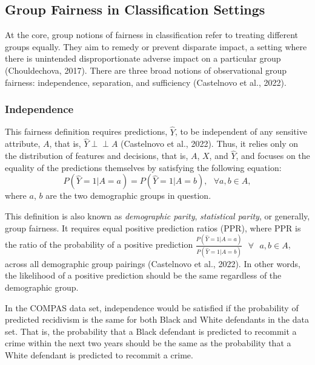 \documentclass[12pt, twoside]{amherstthesis}
\begin{document}
\hypertarget{classfairdef}{%
\subsection{Group Fairness in Classification Settings}\label{classfairdef}}

At the core, group notions of fairness in classification refer to treating different groups equally. They aim to remedy or prevent disparate impact, a setting where there is unintended disproportionate adverse impact on a particular group (Chouldechova, 2017). There are three broad notions of observational group fairness: independence, separation, and sufficiency (Castelnovo et al., 2022).

\hypertarget{independence}{%
\subsubsection{Independence}\label{independence}}

\newcommand{\indep}{\perp \!\!\! \perp}

This fairness definition requires predictions, \(\hat{Y}\), to be independent of any sensitive attribute, \(A\), that is, \(\hat{Y} \perp \!\!\! \perp A\) (Castelnovo et al., 2022). Thus, it relies only on the distribution of features and decisions, that is, \(A\), \(X\), and \(\hat{Y}\), and focuses on the equality of the predictions themselves by satisfying the following equation:
\begin{equation}
\label{ch1eq3}
P (\hat{Y} = 1 | A = a) = P (\hat{Y} = 1 | A = b), \text{    } \forall a, b \in A,
\end{equation}
where \(a\), \(b\) are the two demographic groups in question.

This definition is also known as \emph{demographic parity}, \emph{statistical parity}, or generally, group fairness. It requires equal positive prediction ratios (PPR), where PPR is the ratio of the probability of a positive prediction \(\frac{P(\hat{Y} = 1 | A = a)}{P(\hat{Y} = 1 | A = b)} \text{ } \forall \text{ } a, b \in A\), across all demographic group pairings (Castelnovo et al., 2022). In other words, the likelihood of a positive prediction should be the same regardless of the demographic group.

In the COMPAS data set, independence would be satisfied if the probability of predicted recidivism is the same for both Black and White defendants in the data set. That is, the probability that a Black defendant is predicted to recommit a crime within the next two years should be the same as the probability that a White defendant is predicted to recommit a crime.
\end{document}
